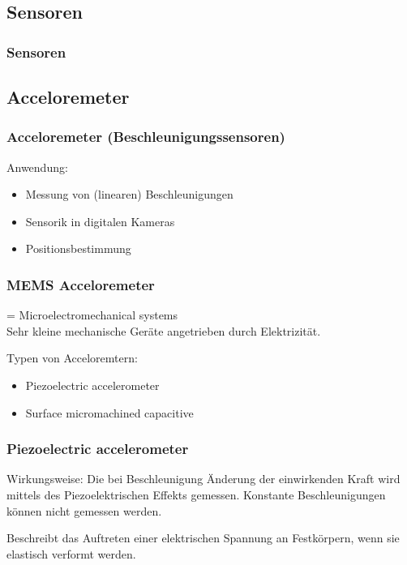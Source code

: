 \documentclass[10pt,a4paper,oneside]{beamer}
\begin{document}
\begin{frame}
  \section{Sensoren}
  \frametitle{Sensoren}
\end{frame}

\begin{frame}
  \subsection{Acceloremeter}
  \frametitle{Acceloremeter (Beschleunigungssensoren)}
  
  Anwendung:
  \begin{itemize}
    \item Messung von (linearen) Beschleunigungen
  	\item Sensorik in digitalen Kameras
  	\item Positionsbestimmung
  \end{itemize}
\end{frame}

\begin{frame}
  \frametitle{MEMS Acceloremeter}
  
  \begin{definition}[MEMS]
  = Microelectromechanical systems \\
  Sehr kleine mechanische Geräte angetrieben durch Elektrizität.
  \end{definition}
   Typen von Acceloremtern:
  \begin{itemize}
    \item Piezoelectric accelerometer
  	\item Surface micromachined capacitive
  \end{itemize}
\end{frame}

\begin{frame}
  \frametitle{Piezoelectric accelerometer}
  Wirkungsweise: Die bei Beschleunigung Änderung der einwirkenden Kraft wird mittels des Piezoelektrischen Effekts gemessen.
  Konstante Beschleunigungen können nicht gemessen werden.
    \bigskip
    \begin{definition}[Piezoelektrizität]
		Beschreibt das Auftreten einer elektrischen Spannung an Festkörpern, wenn sie elastisch verformt werden.
	\end{definition}
\end{frame}
\end{document}
